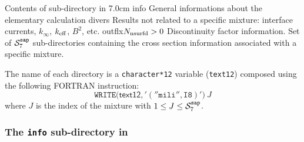 \begin{DescriptionEnregistrement}{Contents of sub-directory  in }{7.0cm}
\DirEnr
  {info}
  {General informations about the elementary calculation}
\DirEnr
  {divers}
  {Results not related to a specific mixture: interface currents, $k_\infty$, $k_{\rm eff}$, $B^2$, etc.}
\OptDirEnr
  {outflx}{$N_{\rm nsurfd}>0$}
  {Discontinuity factor information.}
\DirVar
  {}
  {Set of $\mathcal{S}^{\tt sap}_{7}$ sub-directories containing the cross section information
   associated with a specific mixture.}
\end{DescriptionEnregistrement}

The name of each  directory is a {\tt character*12} variable ({\tt text12})
composed using the following FORTRAN instruction:
$$
\mathtt{WRITE(}\mathsf{text12}\mathtt{,'(''mili'',I8)')}\: J
$$
where $J$ is the index of the mixture with $1 \leq J \leq \mathcal{S}^{\tt sap}_{7}$.

\subsubsection{The {\tt info} sub-directory in }\label{sect:sapdirinfo}

\vskip -0.5cm

